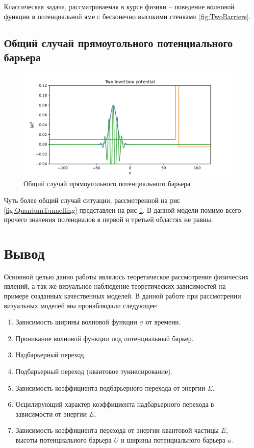 \documentclass[a4paper, 12pt]{article}
\begin{document}
    Классическая задача, рассматриваемая в курсе физики -- поведение волновой функции в потенциальной яме с бесконечно высокими
    стенками \ref{fig:TwoBarriers}.
    
    \subsection{Общий случай прямоугольного потенциального барьера}

    \begin{figure}
        \centering
        \includegraphics[scale=0.5]{images/TwoLevelBoxPotential.pdf}
        \caption{Общий случай прямоугольного потенциального барьера}
        \label{fig:TwoLevelBoxPotential}
    \end{figure}

    Чуть более общий случай ситуации, рассмотренной на рис \ref{fig:QuantumTunnelling} представлен на рис 
    \ref{fig:TwoLevelBoxPotential}. В данной модели помимо всего прочего значения потенциалов в первой и третьей областях не равны.

    \section{Вывод}

    Основной целью данно работы являлось теоретическое рассмотрение физических явлений, а так же визуальное наблюдение
    теоретических зависимостей на примере созданных качественных моделей. В данной работе при рассмотрении визуальных моделей
    мы пронаблюдали следующее:

    \begin{enumerate}
        \item Зависимость ширины волновой функции $\sigma$ от времени.
        \item Проникание волновой функции под потенциальный барьер.
        \item Надбарьерный переход.
        \item Подбарьерный переход (квантовое туннелирование).
        \item Зависимость коэффициента подбарьерного перехода от энергии $E$.
        \item Осцилирующий характер коэффициента надбарьерного перехода в зависимости от энергии $E$.
        \item Зависимость коэффициента перехода от энергии квантовой частицы $E$, высоты потенциального барьера $U$ и ширины 
        потенциального барьера $a$.
    \end{enumerate}
    
\end{document}
